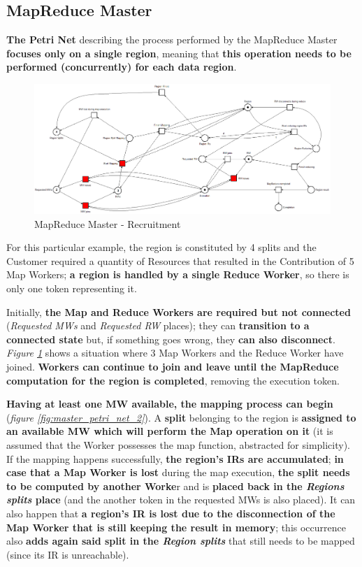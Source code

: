 \subsection{MapReduce Master}
\textbf{The Petri Net} describing the process performed by the MapReduce Master \textbf{focuses only on a single region}, meaning that \textbf{this operation needs to be performed (concurrently) for each data region}. 
\begin{figure}[!ht]
    \centering
    \includegraphics[width=\linewidth]{document/chapters/chapter_5/images/master_petri_net_1.png}
    \caption{MapReduce Master - Recruitment}
    \label{fig:master_petri_net_1}
\end{figure}

For this particular example, the region is constituted by 4 splits and the Customer required a quantity of Resources that resulted in the Contribution of 5 Map Workers; \textbf{a region is handled by a single Reduce Worker}, so there is only one token representing it.

Initially, \textbf{the Map and Reduce Workers are required but not connected} (\textit{Requested MWs} and \textit{Requested RW} places); they can \textbf{transition to a connected state} but, if something goes wrong, they \textbf{can also disconnect}. \textit{Figure \ref{fig:master_petri_net_1}} shows a situation where 3 Map Workers and the Reduce Worker have joined. \textbf{Workers can continue to join and leave until the MapReduce computation for the region is completed}, removing the execution token.

\textbf{Having at least one MW available, the mapping process can begin} (\textit{figure \ref{fig:master_petri_net_2}}). A \textbf{split} belonging to the region is \textbf{assigned to an available MW which will perform the Map operation on it} (it is assumed that the Worker possesses the map function, abstracted for simplicity). If the mapping happens successfully, \textbf{the region's IRs are accumulated}; \textbf{in case that a Map Worker is lost} during the map execution, \textbf{the split needs to be computed by another Worke}r and is \textbf{placed back in the \textit{Regions splits} place} (and the another token in the requested MWs is also placed).
It can also happen that \textbf{a region's IR is lost due to the disconnection of the Map Worker that is still keeping the result in memory}; this occurrence also \textbf{adds again said split in the \textit{Region splits}} that still needs to be mapped (since its IR is unreachable).

